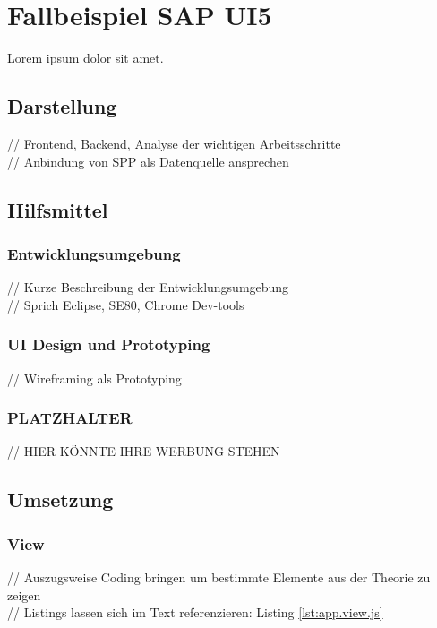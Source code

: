 \documentclass[12pt,a4paper,bibliography=totocnumbered,listof=totocnumbered]{scrartcl}
\begin{document}
\section{Fallbeispiel SAP UI5}
Lorem ipsum dolor sit amet.

\subsection{Darstellung}
// Frontend, Backend, Analyse der wichtigen Arbeitsschritte\\
// Anbindung von \ac{SPP} als Datenquelle ansprechen\\

\subsection{Hilfsmittel}
\subsubsection{Entwicklungsumgebung}
// Kurze Beschreibung der Entwicklungsumgebung\\
// Sprich Eclipse, SE80, Chrome Dev-tools\\

\subsubsection{UI Design und Prototyping}
// Wireframing als Prototyping\\

\subsubsection{PLATZHALTER}
// HIER KÖNNTE IHRE WERBUNG STEHEN \cite{NilsBlog2014}\\

\subsection{Umsetzung}
\subsubsection{View}
// Auszugsweise Coding bringen um bestimmte Elemente aus der Theorie zu zeigen\\
// Listings lassen sich im Text referenzieren: Listing \ref{lst:app.view.js}\\
\end{document}
